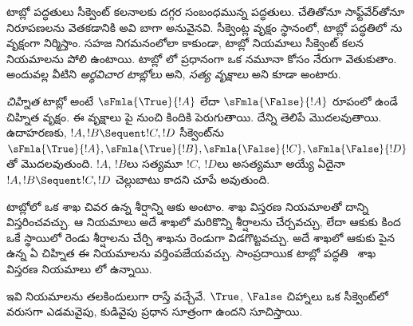 \documentclass[../../../include/open-logic-section]{subfiles}
\begin{document}


టాబ్లో పద్ధతులు సీక్వెంట్ కలనాలకు దగ్గర సంబంధమున్న  పద్ధతులు. చేతితోనూ సాఫ్ట్‌వేర్‌తోనూ నిరూపణలను వెతకడానికి అవి బాగా అనువైనవి. సీక్వెంట్ల వృక్షం స్థానంలో, టాబ్లో పద్ధతిలో ను  వృక్షంగా నిర్మిస్తాం. సహజ నిగమనంలోలా కాకుండా, టాబ్లో నియమాలు సీక్వెంట్ కలన నియమాలను పోలి ఉంటాయి. టాబ్లో లో ప్రధానంగా ఒక నమూనా కోసం నేరుగా వెతుకుతాం. అందువల్ల వీటిని \emph{అర్థవిచార టాబ్లోలు} అని, \emph{సత్య వృక్షాలు} అని కూడా అంటారు.

\emph{చిహ్నిత} టాబ్లో అంటే $\sFmla{\True}{!A}$ లేదా $\sFmla{\False}{!A}$ రూపంలో ఉండే చిహ్నిత  వృక్షం. ఈ వృక్షాలు పై నుంచి కిందికి పెరుగుతాయి. దేన్ని  తెలిపే  మొదలవుతాయి. ఉదాహరణకు, $!A, !B \Sequent !C, !D$ సీక్వెంట్‌ను  $\sFmla{\True}{!A}, \sFmla{\True}{!B},
\sFmla{\False}{!C}, \sFmla{\False}{!D}$తో మొదలవుతుంది. $!A$, $!B$లు సత్యమూ $!C$, $!D$లు అసత్యమూ అయ్యే  ఏదైనా $!A, !B \Sequent !C, !D$ చెల్లుబాటు కాదని చూపే  అవుతుంది.

టాబ్లోలో ఒక శాఖ చివర ఉన్న శీర్షాన్ని ఆకు అంటాం. శాఖ విస్తరణ నియమాలతో దాన్ని విస్తరించవచ్చు. ఆ నియమాలు అదే శాఖలో మరికొన్ని శీర్షాలను చేర్చవచ్చు, లేదా ఆకుకు కింద ఒకే స్థాయిలో రెండు శీర్షాలను చేర్చి శాఖను రెండుగా విడగొట్టవచ్చు. అదే శాఖలో ఆకుకు పైన ఉన్న ఏ చిహ్నిత  ఈ నియమాలను వర్తింపజేయవచ్చు. సాంప్రదాయిక టాబ్లో పద్ధతి~ శాఖ విస్తరణ నియమాలు లో ఉన్నాయి.



ఇవి  నియమాలను తలకిందులుగా రాస్తే వచ్చేవే. $\True$, $\False$ చిహ్నాలు ఒక  సీక్వెంట్‌లో వరుసగా ఎడమవైపు, కుడివైపు ప్రధాన సూత్రంగా ఉందని సూచిస్తాయి.
\end{document}
